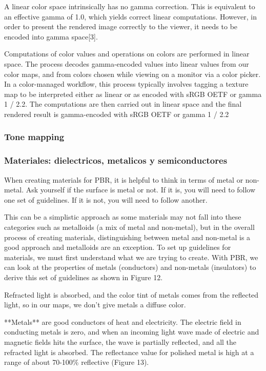             A linear color space intrinsically has no gamma correction. This is equivalent to an effective gamma of 1.0,
            which yields correct linear computations. However, in order to present the rendered image correctly to the
            viewer, it needs to be encoded into gamma space[3].
            
            Computations of color values and operations on colors are performed in linear space. The process decodes
            gamma-encoded values into linear values from our color maps, and from colors chosen while viewing on a monitor
            via a color picker. In a color-managed workflow, this process typically involves tagging a texture map to be
            interpreted either as linear or as encoded with sRGB OETF or gamma 1 / 2.2. The computations are then carried
            out in linear space and the final rendered result is gamma-encoded with sRGB OETF or gamma 1 / 2.2
        \subsubsection{Tone mapping}
        \subsubsection{Materiales: dielectricos, metalicos y semiconductores}
            When creating materials for PBR, it is helpful to think in terms of metal or non-metal. Ask yourself if the
            surface is metal or not. If it is, you will need to follow one set of guidelines. If it is not, you will need
            to follow another.

            This can be a simplistic approach as some materials may not fall into these categories such as metalloids (a mix
            of metal and non-metal), but in the overall process of creating materials, distinguishing between metal and non-metal
            is a good approach and metalloids are an exception. To set up guidelines for materials, we must first understand what
            we are trying to create. With PBR, we can look at the properties of metals (conductors) and non-metals (insulators) to
            derive this set of guidelines as shown in Figure 12.
            
            Refracted light is absorbed, and the color tint of metals comes from the reflected light, so in our maps, we don’t give
            metals a diffuse color. 
            
            **Metals** are good conductors of heat and electricity. The electric field in conducting metals is zero, and when an
            incoming light wave made of electric and magnetic fields hits the surface, the wave is partially reflected, and all the
            refracted light is absorbed. The reflectance value for polished metal is high at a range of about 70-100\% reflective
            (Figure 13).
            

